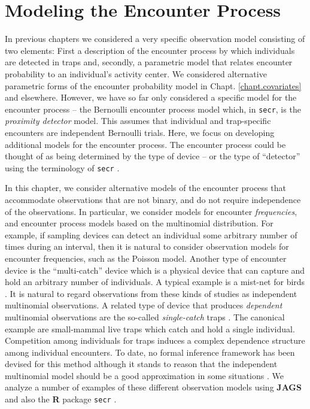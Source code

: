 \chapter{Modeling the Encounter Process}
\label{chapt.poisson-mn}

\vspace{.3in}



In previous chapters we considered a very specific observation model
consisting of two elements: First a description of the encounter
process by which individuals are detected in traps and, secondly, a
parametric model that relates encounter probability to an individual's
activity center.  We considered alternative parametric forms of the
encounter probability model in Chapt. \ref{chapt.covariates} and
elsewhere. However, we have so far only considered
a specific model for the encounter process --
the Bernoulli encounter process model which, in \mbox{\tt secr}, is
the {\it proximity detector} model. This assumes that individual and
trap-specific encounters are independent Bernoulli trials.  Here, we
focus on developing additional models for the encounter process.  The
encounter process could be thought of as being determined by the type
of device -- or the type of ``detector'' using the terminology of
\mbox{\tt secr} \citep{efford:2011}.

In this chapter, we consider alternative models of the encounter
process that accommodate observations that are not binary, and do not
require independence of the observations. 
In particular, we consider models for
encounter {\it frequencies}, and encounter process models based on the
multinomial distribution. For example, if sampling devices can detect
an individual some arbitrary number of times during an interval, then
it is natural to consider observation models for encounter
frequencies, such as the Poisson model. Another type of encounter
device is the ``multi-catch'' device \citep{efford_etal:2009euring}
which is a physical device that can capture and hold an arbitrary
number of individuals. A typical example is a mist-net for birds
\citep{borchers_efford:2008}.  It is natural to regard observations
from these kinds of studies as independent multinomial observations.
A related type of device that produces {\it dependent} multinomial
observations are the so-called {\it single-catch} traps
\citep{efford:2004, efford_etal:2009euring}. The canonical example are
small-mammal live traps  which catch and
hold a single individual. Competition among individuals for traps
induces a complex dependence structure among individual encounters. To
date, no formal inference framework has been devised for this method
although it stands to reason that the independent multinomial model
should be a good approximation in some situations
\citep{efford_etal:2009euring}.
We analyze a number of examples of these different observation models
using {\bf JAGS} and also the {\bf R}
package \mbox{\tt secr} \citep{efford:2011}.





